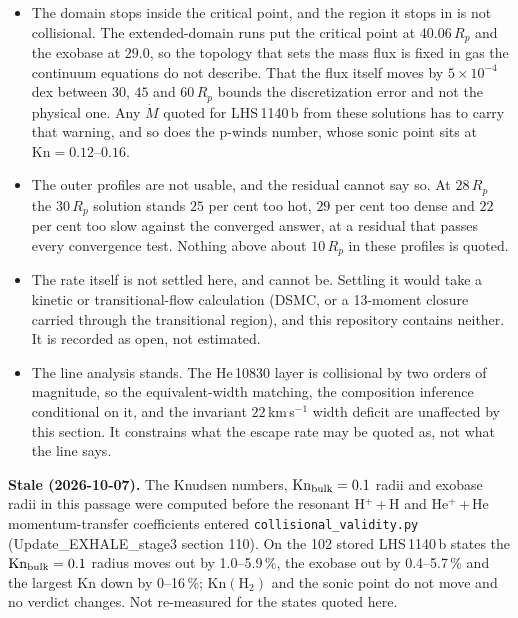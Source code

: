 \documentclass[english,a4paper]{my_memo}
\begin{document}
\begin{itemize}
\item The domain stops inside the critical point, and the region it stops
      in is not collisional. The extended-domain runs put the
      critical point at $40.06\,R_p$ and the exobase at $29.0$, so the
      topology that sets the mass flux is fixed in gas the continuum
      equations do not describe. That the flux itself moves by
      $5\times10^{-4}$\,dex between $30$, $45$ and $60\,R_p$ bounds the
      discretization error and not the physical one. Any $\dot M$ quoted for
      LHS\,1140\,b from these solutions has to carry that warning, and so
      does the p-winds number, whose sonic point sits at
      $\mathrm{Kn} = 0.12$--$0.16$.
\item The outer profiles are not usable, and the residual cannot say so.
      At $28\,R_p$ the $30\,R_p$ solution stands $25$ per cent too
      hot, $29$ per cent too dense and $22$ per cent too slow against the
      converged answer, at a residual that passes every convergence test.
      Nothing above about $10\,R_p$ in these profiles is quoted.
\item The rate itself is not settled here, and cannot be. Settling it would
      take a kinetic or transitional-flow calculation (DSMC, or a
      13-moment closure carried through the transitional region), and this
      repository contains neither. It is recorded as open, not estimated.
\item The line analysis stands. The He\,10830 layer is collisional
      by two orders of magnitude, so the equivalent-width matching, the
      composition inference conditional on it, and the invariant
      $22$\,km\,s$^{-1}$ width deficit are unaffected by this section. It
      constrains what the escape rate may be quoted as, not what the line
      says.
\end{itemize}

\noindent\textbf{Stale (2026-10-07).} The Knudsen numbers, $\mathrm{Kn}_{\rm bulk}=0.1$ radii and exobase radii in this passage were computed before the resonant H$^+$\,+\,H and He$^+$\,+\,He momentum-transfer coefficients entered \texttt{collisional\_validity.py} (Update\_EXHALE\_stage3 section 110). On the 102 stored LHS\,1140\,b states the $\mathrm{Kn}_{\rm bulk}=0.1$ radius moves out by 1.0--5.9\,\%, the exobase out by 0.4--5.7\,\% and the largest Kn down by 0--16\,\%; $\mathrm{Kn}(\mathrm{H_2})$ and the sonic point do not move and no verdict changes. Not re-measured for the states quoted here.
\end{document}
